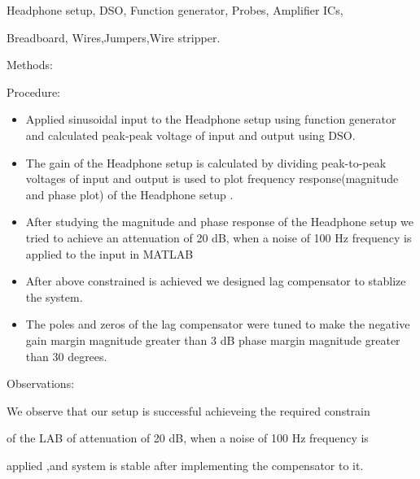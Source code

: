\documentclass[12pt]{report}
\begin{document}
\begin{Large}
Headphone setup, DSO, Function generator, Probes, Amplifier ICs,

Breadboard, Wires,Jumpers,Wire stripper.\\

\newpage
\begin{Large}
Methods:\\
\end{Large}


Procedure:\\

\begin{Large}
\begin{itemize}
 
    
\item Applied sinusoidal input to the Headphone setup using function generator and calculated peak-peak voltage of input and output using DSO.

\item The gain of the Headphone setup is calculated by dividing peak-to-peak voltages of input and output is used to plot frequency response(magnitude and phase plot) of the Headphone setup .

\item After studying the magnitude and phase response of the Headphone setup we tried to achieve an attenuation of 20 dB, when a noise of 100 Hz frequency is applied to the input in MATLAB

\item After above constrained is achieved we designed lag compensator to stablize the system.

\item The poles and zeros of the lag compensator were tuned to make the negative gain margin magnitude greater than 3 dB phase margin magnitude greater than 30 degrees.
\vspace{3em}
\end{itemize}

\end{Large}
\begin{Large}
Observations:\\
\end{Large}

We observe that our setup is successful achieveing the required constrain

of the LAB of attenuation of 20 dB, when a noise of 100 Hz frequency is

applied ,and system is stable after implementing the compensator to it.\\


\end{Large}
\end{document}
